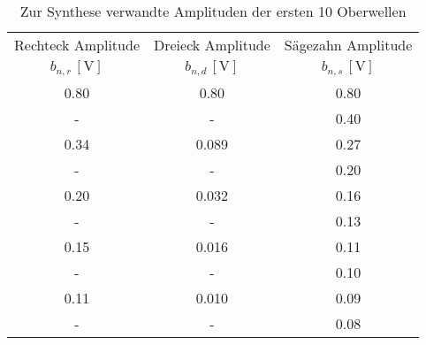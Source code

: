 \begin{table}[!h]
	\centering
	\begin{tabular}{|c|c|c|}
		\hline
		  Rechteck Amplitude    &    Dreieck Amplitude    &   Sägezahn Amplitude    \\
		$b_{n,r}\,[\si{\volt}]$ & $b_{n,d}\,[\si{\volt}]$ & $b_{n,s}\,[\si{\volt}]$ \\ \hline\hline
		      \num{0.80}        &       \num{0.80}        &       \num{0.80}        \\
		           -            &            -            &       \num{0.40}       \\
		      \num{0.34}        &       \num{0.089}       &       \num{0.27}       \\
		           -            &            -            &       \num{0.20}       \\
		      \num{0.20}        &       \num{0.032}       &       \num{0.16}       \\
		           -            &            -            &       \num{0.13}       \\
		      \num{0.15}        &       \num{0.016}       &       \num{0.11}       \\
		           -            &            -            &       \num{0.10}       \\
		      \num{0.11}        &       \num{0.010}       &       \num{0.09}       \\
		           -            &            -            &       \num{0.08}     \\
		      \hline
	\end{tabular}
	\caption{Zur Synthese verwandte Amplituden der ersten 10 Oberwellen \label{tab:Synthese}}
\end{table}